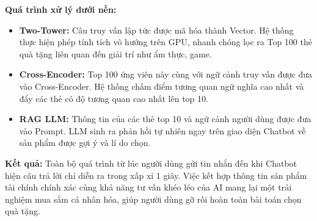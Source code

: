 \textbf{Quá trình xử lý dưới nền:}
\begin{itemize}
    \item \textbf{Two-Tower:} Câu truy vấn lập tức được mã hóa thành Vector. Hệ thống thực hiện phép tính tích vô hướng trên GPU, nhanh chóng lọc ra Top 100 thẻ quà tặng liên quan đến giải trí như ẩm thực, game.
    \item \textbf{Cross-Encoder:} Top 100 ứng viên này cùng với ngữ cảnh truy vấn được đưa vào Cross-Encoder. Hệ thống chấm điểm tương quan ngữ nghĩa cao nhất và đẩy các thẻ có độ tương quan cao nhất lên top 10.
    \item \textbf{RAG LLM:} Thông tin của các thẻ top 10 và ngữ cảnh người dùng được đưa vào Prompt. LLM sinh ra phản hồi tự nhiên ngay trên giao diện Chatbot về sản phẩm được gợi ý và lí do chọn.
\end{itemize}

\textbf{Kết quả:} Toàn bộ quá trình từ lúc người dùng gửi tin nhắn đến khi Chatbot hiện câu trả lời chỉ diễn ra trong xấp xỉ 1 giây. Việc kết hợp thông tin sản phẩm tài chính chính xác cùng khả năng tư vấn khéo léo của AI mang lại một trải nghiệm mua sắm cá nhân hóa, giúp người dùng gỡ rối hoàn toàn bài toán chọn quà tặng.
